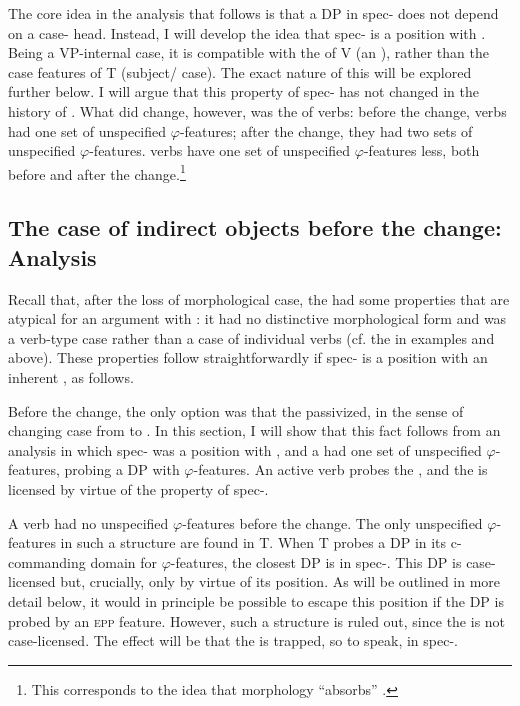 \documentclass[output=paper]{langscibook}
\begin{document}
The core idea in the analysis that follows is that a DP in spec- does not depend on a case- head. Instead, I will develop the idea that spec- is a position with . Being a VP-internal case, it is compatible with the  of V (an ), rather than the case features of T (subject/ case). The exact nature of this  will be explored further below. I will argue that this property of spec- has not changed in the history of . What did change, however, was the  of  verbs: before the change,  verbs had one set of unspecified $\varphi ${}-features; after the change, they had two sets of unspecified $\varphi $-features.  verbs have one set of unspecified $\varphi ${}-features less, both before and after the change.\footnote{This corresponds to the idea that  morphology “absorbs” .}


\subsection{The case of indirect objects before the change: Analysis}\label{sec:falk:4.2}


Recall that, after the loss of morphological case, the  had some properties that are atypical for an argument with : it had no distinctive morphological form and was a verb-type case rather than a case of individual verbs (cf. the  in examples  and  above). These properties follow straightforwardly if spec- is a position with an inherent , as follows.


Before the change, the only option was that the  passivized, in the sense of changing case from  to . In this section, I will show that this fact follows from an analysis in which spec- was a position with , and a  had one set of unspecified $\varphi ${}-features, probing a DP with $\varphi $-features. An active verb probes the , and the  is licensed by virtue of the  property of spec-. 



A  verb had no unspecified $\varphi $-features before the change. The only unspecified $\varphi $-features in such a structure are found in T. When T probes a DP in its c-commanding domain for $\varphi $-features, the closest DP is in spec-. This DP is case-licensed but, crucially, only by virtue of its position. As will be outlined in more detail below, it would in principle be possible to escape this position if the  DP is probed by an \textsc{epp} feature. However, such a structure is ruled out, since the  is not case-licensed. The effect will be that the  is trapped, so to speak, in spec-. 
\end{document}
